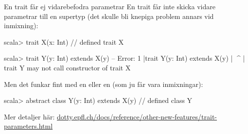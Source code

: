 \begin{Slide}{En trait får ej vidarebefodra parametrar}\SlideFontSmall
En trait får inte skicka vidare parametrar till en supertyp (det skulle bli knepiga problem annars vid inmixning):
\begin{REPLnonum}
scala> trait X(x: Int)
// defined trait X

scala> trait Y(y: Int) extends X(y)
-- Error:
1 |trait Y(y: Int) extends X(y)
  |                        ^^^^
  |  trait Y may not call constructor of trait X
\end{REPLnonum}
Men det funkar fint med en  eller en  (som ju  får vara inmixningar):
\begin{REPLnonum}
scala> abstract class Y(y: Int) extends X(y)                                                           
// defined class Y
\end{REPLnonum}
{ \SlideFontTiny Mer detaljer här: \href{https://dotty.epfl.ch/docs/reference/other-new-features/trait-parameters.html}{dotty.epfl.ch/docs/reference/other-new-features/trait-parameters.html}}
\end{Slide}



